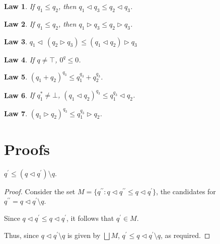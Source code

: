 \documentclass[acmsmall,screen,nonacm]{acmart}
\DeclareMathOperator{\scale}{\mathbin{\triangleleft}}
\DeclareMathOperator{\boxop}{\mathbin{\triangleright}}
\newtheorem{law}{Law}
\begin{document}
\begin{law}
\label{law:mul-mono-right-scale}
  If $q_1 \le q_2$, then $q_1 \scale q_3 \le q_2 \scale q_3$.
\end{law}

\begin{law}
\label{law:mul-mono-right}
  If $q_1 \le q_2$, then $q_1 \boxop q_3 \le q_2 \boxop q_3$.
\end{law}

\begin{law}
\label{law:scale-box-assoc}
  $q_1 \scale \, (q_2 \boxop q_3) \le (q_1 \scale q_2) \boxop q_3$
\end{law}

\begin{law}

\label{law:zero-exp}
  If $q \ne \top$, $0^q \le 0$.
\end{law}

\begin{law}
\label{law:exp-distr-add}
  $(q_1 + q_2)^{q_3} \le q_1^{q_3} + q_2^{q_3}$.
\end{law}

\begin{law}
\label{law:exp-outside-scale}
 If $q_1^* \ne \bot$, $(q_1 \scale q_2)^{q_3} \le q_1^{q_3} \scale q_2$.
\end{law}
\begin{law}

\label{law:exp-outside-box}
 $(q_1 \boxop q_2)^{q_3} \le q_1^{q_3} \boxop q_2$.
\end{law}

\section{Proofs}

\begin{lemma}
\label{lem:mul-left-inverse-div-1}
  $q^\prime \le (q \scale q^\prime) \setminus q$.
\end{lemma}

\begin{proof}
  Consider the set $M = \{q^{\prime\prime} : q \scale q^{\prime\prime} \le q \scale q^\prime\}$, the candidates for $q^{\prime\prime} = q \scale q^\prime \setminus q$.

  Since $q \scale q^\prime \le q \scale q^\prime$, it follows that $q^\prime \in M$.
  
  Thus, since $q \scale q^\prime \setminus q$ is given by $\bigsqcup M$, $q^\prime \le q \scale q^\prime \setminus q$, as required.
  
\end{proof}
\end{document}

